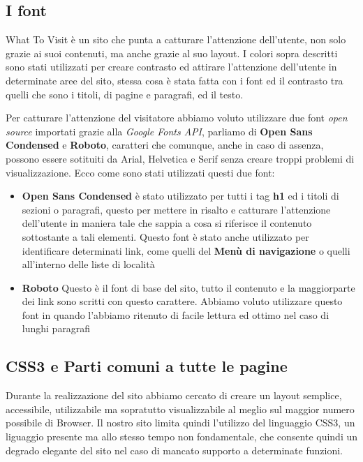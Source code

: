 \subsection{I font}\label{sec:Pres-Font}
What To Visit è un sito che punta a catturare l'attenzione dell'utente, non solo grazie ai suoi contenuti, ma anche grazie al suo layout.
I colori sopra descritti sono stati utilizzati per creare contrasto ed attirare l'attenzione dell'utente in determinate aree del sito, stessa cosa è stata fatta con i font ed il contrasto tra quelli che sono i titoli, di pagine e paragrafi, ed il testo.

Per catturare l'attenzione del visitatore abbiamo voluto utilizzare due font \textit{open source} importati grazie alla \textit{Google Fonts API}, parliamo di \textbf{Open Sans Condensed} e \textbf{Roboto}, caratteri che comunque, anche in caso di assenza, possono essere sotituiti da Arial, Helvetica e Serif senza creare troppi problemi di visualizzazione. Ecco come sono stati utilizzati questi due font:
\begin{itemize}
\item \textbf{Open Sans Condensed} è stato utilizzato per tutti i tag \textbf{h1} ed i titoli di sezioni o paragrafi, questo per mettere in risalto e catturare l'attenzione dell'utente in maniera tale che sappia a cosa si riferisce il contenuto sottostante a tali elementi.
Questo font è stato anche utilizzato per identificare determinati link, come quelli del \textbf{Menù di navigazione} o quelli all'interno delle liste di località
\item \textbf{Roboto} Questo è il font di base del sito, tutto il contenuto e la maggiorparte dei link sono scritti con questo carattere. Abbiamo voluto utilizzare questo font in quando l'abbiamo ritenuto di facile lettura ed ottimo nel caso di lunghi paragrafi
\end{itemize}

\subsection{CSS3 e Parti comuni a tutte le pagine}
Durante la realizzazione del sito abbiamo cercato di creare un layout semplice, accessibile, utilizzabile ma sopratutto visualizzabile al meglio sul maggior numero possibile di Browser. Il nostro sito limita quindi l'utilizzo del linguaggio CSS3, un liguaggio presente ma allo stesso tempo non fondamentale, che consente quindi un degrado elegante del sito nel caso di mancato supporto a determinate funzioni.

